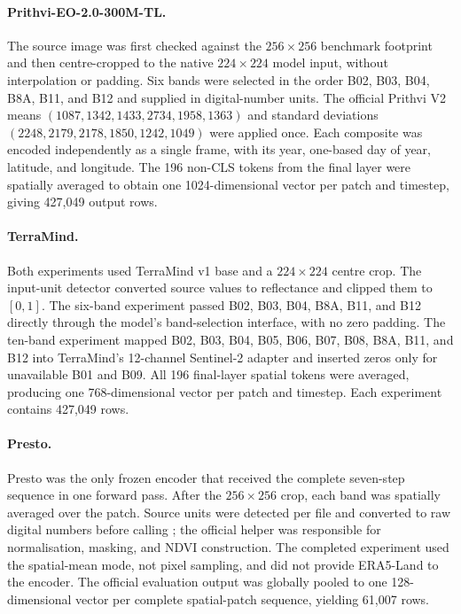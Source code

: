 \paragraph{Prithvi-EO-2.0-300M-TL.}
The source image was first checked against the $256\times256$ benchmark
footprint and then centre-cropped to the native $224\times224$ model input,
without interpolation or padding.  Six bands were selected in the order B02,
B03, B04, B8A, B11, and B12 and supplied in digital-number units.  The official
Prithvi V2 means $(1087,1342,1433,2734,1958,1363)$ and standard deviations
$(2248,2179,2178,1850,1242,1049)$ were applied once.  Each composite was
encoded independently as a single frame, with its year, one-based day of year,
latitude, and longitude.  The 196 non-CLS tokens from the final layer were
spatially averaged to obtain one 1024-dimensional vector per patch and
timestep, giving 427,049 output rows.

\paragraph{TerraMind.}
Both experiments used TerraMind v1 base and a $224\times224$ centre crop.  The
input-unit detector converted source values to reflectance and clipped them to
$[0,1]$.  The six-band experiment passed B02, B03, B04, B8A, B11, and B12
directly through the model's band-selection interface, with no zero padding.
The ten-band experiment mapped B02, B03, B04, B05, B06, B07, B08, B8A, B11,
and B12 into TerraMind's 12-channel Sentinel-2 adapter and inserted zeros only
for unavailable B01 and B09.  All 196 final-layer spatial tokens were averaged,
producing one 768-dimensional vector per patch and timestep.  Each experiment
contains 427,049 rows.

\paragraph{Presto.}
Presto was the only frozen encoder that received the complete seven-step
sequence in one forward pass.  After the $256\times256$ crop, each band was
spatially averaged over the patch.  Source units were detected per file and
converted to raw digital numbers before calling
; the official helper was responsible
for normalisation, masking, and NDVI construction.  The completed experiment
used the spatial-mean mode, not pixel sampling, and did not provide ERA5-Land to
the encoder.  The official evaluation output was globally pooled to one
128-dimensional vector per complete spatial-patch sequence, yielding 61,007
rows.

